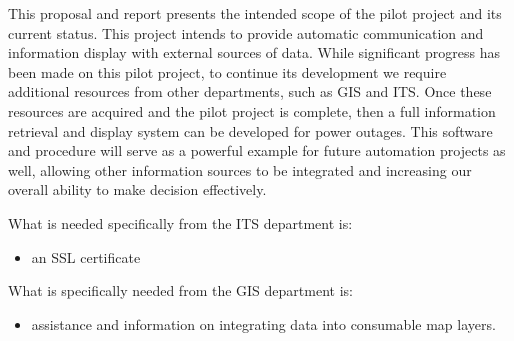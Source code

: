 \documentclass[letterpaper, notitlepage]{report}
\begin{document}
This proposal and report presents the intended scope of the pilot project and its current status. This project intends to provide automatic communication and information display with external sources of data. While significant progress has been made on this pilot project, to continue its development we require additional resources from other departments, such as GIS and ITS. Once these resources are acquired and the pilot project is complete, then a full information retrieval and display system can be developed for power outages. This software and procedure will serve as a powerful example for future automation projects as well, allowing other information sources to be integrated and increasing our overall ability to make decision effectively.

What is needed specifically from the ITS department is:
\begin{itemize}
    \item an SSL certificate
\end{itemize}

What is specifically needed from the GIS department is:
\begin{itemize}
    \item assistance and information on integrating data into consumable map layers.
\end{itemize}
\end{document}

